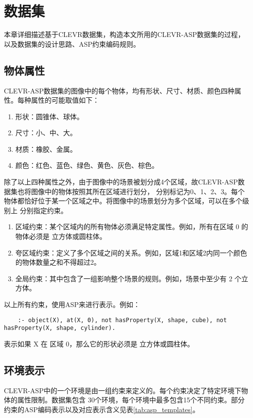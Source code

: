 \chapter{数据集}
本章详细描述基于CLEVR数据集，构造本文所用的CLEVR-ASP数据集的过程，以及数据集的设计思路、ASP约束编码规则。
\section{物体属性}
CLEVR-ASP数据集的图像中的每个物体，均有形状、尺寸、材质、颜色四种属性。每种属性的可能取值如下：
\begin{enumerate}[label=(\arabic*),itemsep=0pt,parsep=0pt]
    \item 形状：圆锥体、球体。
    \item 尺寸：小、中、大。
    \item 材质：橡胶、金属。
    \item 颜色：红色、蓝色、绿色、黄色、灰色、棕色。
\end{enumerate}

除了以上四种属性之外，由于图像中的场景被划分成4个区域，故CLEVR-ASP数据集也将图像中的物体按照其所在区域进行划分，
分别标记为0、1、2、3。每个物体都恰好位于某一个区域之中。将图像中的场景划分为多个区域，可以在多个级别上
分别指定约束。

\begin{enumerate}[itemsep=0pt,parsep=0pt]
    \item 区域约束：某个区域内的所有物体必须满足特定属性。例如，所有在区域 0 的物体必须是 立方体或圆柱体。
    \item 夸区域约束：定义了多个区域之间的关系。例如，区域1和区域2内同一个颜色的物体数量之和不得超过2。
    \item 全局约束：其中包含了一组影响整个场景的规则。例如，场景中至少有 2 个立方体。
\end{enumerate}

以上所有约束，使用ASP来进行表示。例如：
\begin{lstlisting}
    :- object(X), at(X, 0), not hasProperty(X, shape, cube), not hasProperty(X, shape, cylinder).
\end{lstlisting}
表示如果 X 在 区域 0，那么它的形状必须是 立方体或圆柱体。

\section{环境表示}
CLEVR-ASP中的一个环境是由一组约束来定义的。每个约束决定了特定环境下物体的属性限制。数据集包含
30个环境，每个环境中最多包含15个不同约束。部分约束的ASP编码表示以及对应表示含义见表\ref{tab:asp_templates}。

